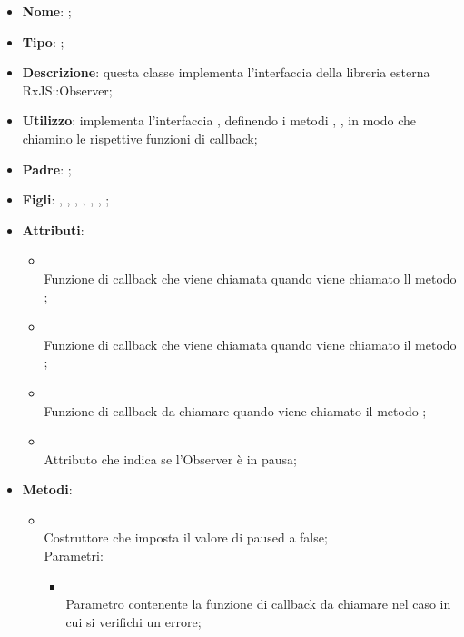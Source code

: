 \begin{itemize}
	\item \textbf{Nome}: ;
	\item \textbf{Tipo}: ;
	\item \textbf{Descrizione}: questa classe implementa l'interfaccia della libreria esterna RxJS::Observer;
	\item \textbf{Utilizzo}: implementa l'interfaccia , definendo i metodi , ,  in modo che chiamino le rispettive funzioni di callback;
	\item \textbf{Padre}: ;
	\item \textbf{Figli}: , , , , , , ;
	\item \textbf{Attributi}:
	\begin{itemize}
		\item[]  \\
		Funzione di callback che viene chiamata quando viene chiamato ll metodo ;
		\item[]  \\
		Funzione di callback che viene chiamata quando viene chiamato il metodo ;
		\item[]  \\
		Funzione di callback da chiamare quando viene chiamato il metodo ;
		\item[]  \\
		Attributo che indica se l'Observer è in pausa;
	\end{itemize}
	\item \textbf{Metodi}:
	\begin{itemize}
		\item[]  \\
		Costruttore che imposta il valore di paused a false;\\
		Parametri:
		\begin{itemize}
			\item {} \\
			Parametro contenente la funzione di callback da chiamare nel caso in cui si verifichi un errore;

\end{itemize}
\end{itemize}
\end{itemize}
